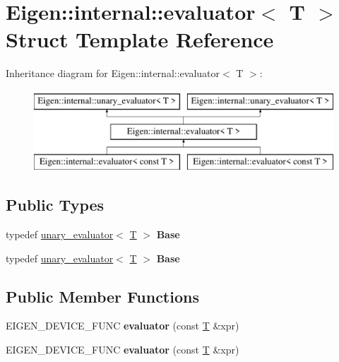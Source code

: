 \hypertarget{struct_eigen_1_1internal_1_1evaluator}{}\section{Eigen\+:\+:internal\+:\+:evaluator$<$ T $>$ Struct Template Reference}
\label{struct_eigen_1_1internal_1_1evaluator}
Inheritance diagram for Eigen\+:\+:internal\+:\+:evaluator$<$ T $>$\+:\begin{figure}[H]
\begin{center}
\leavevmode
\includegraphics[height=3.000000cm]{struct_eigen_1_1internal_1_1evaluator}
\end{center}
\end{figure}
\subsection*{Public Types}
\begin{DoxyCompactItemize}
\item 
\mbox{\label{struct_eigen_1_1internal_1_1evaluator_a23e380d87319deaa59368cdf3db87b2b}} 
typedef \hyperlink{struct_eigen_1_1internal_1_1unary__evaluator}{unary\+\_\+evaluator}$<$ \hyperlink{group___sparse_core___module}{T} $>$ {\bfseries Base}
\item 
\mbox{\label{struct_eigen_1_1internal_1_1evaluator_a23e380d87319deaa59368cdf3db87b2b}} 
typedef \hyperlink{struct_eigen_1_1internal_1_1unary__evaluator}{unary\+\_\+evaluator}$<$ \hyperlink{group___sparse_core___module}{T} $>$ {\bfseries Base}
\end{DoxyCompactItemize}
\subsection*{Public Member Functions}
\begin{DoxyCompactItemize}
\item 
\mbox{\label{struct_eigen_1_1internal_1_1evaluator_a3225cac605136d04af9b333d97866a8b}} 
E\+I\+G\+E\+N\+\_\+\+D\+E\+V\+I\+C\+E\+\_\+\+F\+U\+NC {\bfseries evaluator} (const \hyperlink{group___sparse_core___module}{T} \&xpr)
\item 
\mbox{\label{struct_eigen_1_1internal_1_1evaluator_a3225cac605136d04af9b333d97866a8b}} 
E\+I\+G\+E\+N\+\_\+\+D\+E\+V\+I\+C\+E\+\_\+\+F\+U\+NC {\bfseries evaluator} (const \hyperlink{group___sparse_core___module}{T} \&xpr)
\end{DoxyCompactItemize}


